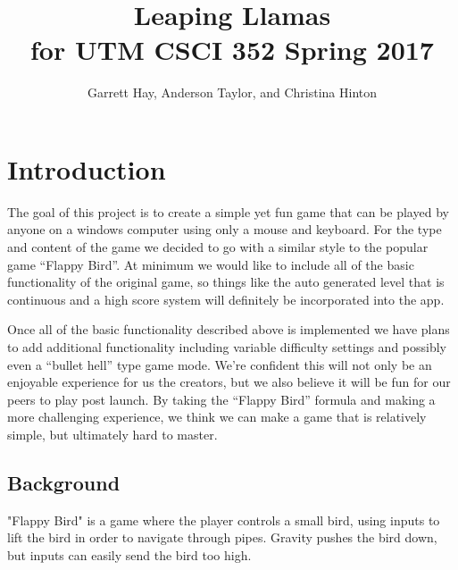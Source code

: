 \documentclass[10pt,conference,onecolumn,compsoc]{IEEEtran}
\begin{document}
\title{Leaping Llamas\\ for UTM CSCI 352 Spring 2017}

\author{Garrett Hay, Anderson Taylor, and Christina Hinton \\ %
}

\maketitle

\IEEEdisplaynontitleabstractindextext
\IEEEpeerreviewmaketitle

\section{Introduction}
	The goal of this project is to create a simple yet fun game that can be played by anyone on a windows computer using only a mouse and keyboard.  For the type and content of the game we decided to go with a similar style to the popular game “Flappy Bird”.  At minimum we would like to include all of the basic functionality of the original game, so things like the auto generated level that is continuous and a high score system will definitely be incorporated into the app.
	
	Once all of the basic functionality described above is implemented we have plans to add additional functionality including variable difficulty settings and possibly even a “bullet hell” type game mode. We’re confident this will not only be an enjoyable experience for us the creators, but we also believe it will be fun for our peers to play post launch. By taking the “Flappy Bird” formula and making a more challenging experience, we think we can make a game that is relatively simple, but ultimately hard to master.
 

\subsection{Background}
	"Flappy Bird" is a game where the player controls a small bird, using inputs to lift the bird in order to navigate through pipes. Gravity pushes the bird down, but inputs can easily send the bird too high.
\end{document}
